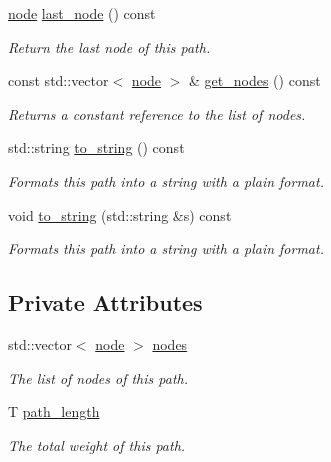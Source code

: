 \begin{DoxyCompactItemize}
\mbox{\label{classlgraph_1_1node__path_a85ba769d1f26ee2b29fddc0e1f998d08}} 
\hyperlink{namespacelgraph_a397169dd66adf725210a30fb7251773e}{node} \hyperlink{classlgraph_1_1node__path_a85ba769d1f26ee2b29fddc0e1f998d08}{last\+\_\+node} () const
\begin{DoxyCompactList}\small\item\em Return the last node of this path. \end{DoxyCompactList}\item 
\mbox{\label{classlgraph_1_1node__path_a64a63ae34c15e10b944dffeadf404b12}} 
const std\+::vector$<$ \hyperlink{namespacelgraph_a397169dd66adf725210a30fb7251773e}{node} $>$ \& \hyperlink{classlgraph_1_1node__path_a64a63ae34c15e10b944dffeadf404b12}{get\+\_\+nodes} () const
\begin{DoxyCompactList}\small\item\em Returns a constant reference to the list of nodes. \end{DoxyCompactList}\item 
std\+::string \hyperlink{classlgraph_1_1node__path_aa488e5ee537e4eff40c46a545a19da50}{to\+\_\+string} () const
\begin{DoxyCompactList}\small\item\em Formats this path into a string with a plain format. \end{DoxyCompactList}\item 
void \hyperlink{classlgraph_1_1node__path_a98545a3a8698bf193f09636829562f0f}{to\+\_\+string} (std\+::string \&s) const
\begin{DoxyCompactList}\small\item\em Formats this path into a string with a plain format. \end{DoxyCompactList}\end{DoxyCompactItemize}
\subsection*{Private Attributes}
\begin{DoxyCompactItemize}
\item 
\mbox{\label{classlgraph_1_1node__path_ae2335b4883c602186ce2dbba9d679b1e}} 
std\+::vector$<$ \hyperlink{namespacelgraph_a397169dd66adf725210a30fb7251773e}{node} $>$ \hyperlink{classlgraph_1_1node__path_ae2335b4883c602186ce2dbba9d679b1e}{nodes}
\begin{DoxyCompactList}\small\item\em The list of nodes of this path. \end{DoxyCompactList}\item 
T \hyperlink{classlgraph_1_1node__path_a3461f9839615e5bc4837d24438117f16}{path\+\_\+length}
\begin{DoxyCompactList}\small\item\em The total weight of this path. \end{DoxyCompactList}\end{DoxyCompactItemize}
